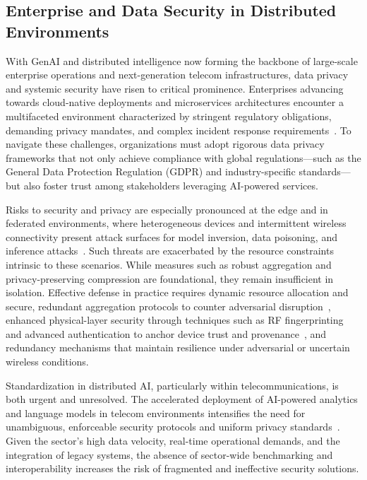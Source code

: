 \documentclass[sigconf]{acmart}
\begin{document}
\subsection{Enterprise and Data Security in Distributed Environments}

With GenAI and distributed intelligence now forming the backbone of large-scale enterprise operations and next-generation telecom infrastructures, data privacy and systemic security have risen to critical prominence. Enterprises advancing towards cloud-native deployments and microservices architectures encounter a multifaceted environment characterized by stringent regulatory obligations, demanding privacy mandates, and complex incident response requirements~\cite{ref17,ref18,ref19}. To navigate these challenges, organizations must adopt rigorous data privacy frameworks that not only achieve compliance with global regulations---such as the General Data Protection Regulation (GDPR) and industry-specific standards---but also foster trust among stakeholders leveraging AI-powered services.

Risks to security and privacy are especially pronounced at the edge and in federated environments, where heterogeneous devices and intermittent wireless connectivity present attack surfaces for model inversion, data poisoning, and inference attacks~\cite{ref17,ref19,ref23,ref24}. Such threats are exacerbated by the resource constraints intrinsic to these scenarios. While measures such as robust aggregation and privacy-preserving compression are foundational, they remain insufficient in isolation. Effective defense in practice requires dynamic resource allocation and secure, redundant aggregation protocols to counter adversarial disruption~\cite{ref49}, enhanced physical-layer security through techniques such as RF fingerprinting and advanced authentication to anchor device trust and provenance~\cite{ref48}, and redundancy mechanisms that maintain resilience under adversarial or uncertain wireless conditions.

Standardization in distributed AI, particularly within telecommunications, is both urgent and unresolved. The accelerated deployment of AI-powered analytics and language models in telecom environments intensifies the need for unambiguous, enforceable security protocols and uniform privacy standards~\cite{ref42,ref44,ref49}. Given the sector's high data velocity, real-time operational demands, and the integration of legacy systems, the absence of sector-wide benchmarking and interoperability increases the risk of fragmented and ineffective security solutions.
\end{document}
